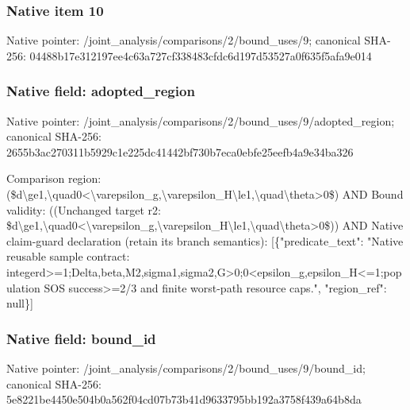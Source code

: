 \documentclass[10pt,a4paper]{article}
\begin{document}
\subsubsection{Native item 10}
Native pointer: /joint\_\allowbreak{}analysis/comparisons/2/bound\_\allowbreak{}uses/9; canonical SHA-256: 04488b17e312197ee4c63a727cf338483cfdc6d197d53527a0f635f5afa9e014

\subsubsection{Native field: adopted\_\allowbreak{}region}
Native pointer: /joint\_\allowbreak{}analysis/comparisons/2/bound\_\allowbreak{}uses/9/adopted\_\allowbreak{}region; canonical SHA-256: 2655b3ac270311b5929c1e225dc41442bf730b7eca0ebfe25eefb4a9e34ba326

\begingroup\raggedright\sloppy Comparison region:\allowbreak{} (\$d\textbackslash{}ge1,\allowbreak{}\textbackslash{}quad0<\textbackslash{}varepsilon\_\allowbreak{}g,\allowbreak{}\textbackslash{}varepsilon\_\allowbreak{}H\textbackslash{}le1,\allowbreak{}\textbackslash{}quad\textbackslash{}theta>0\$) AND Bound validity:\allowbreak{} ((Unchanged target r2:\allowbreak{} \$d\textbackslash{}ge1,\allowbreak{}\textbackslash{}quad0<\textbackslash{}varepsilon\_\allowbreak{}g,\allowbreak{}\textbackslash{}varepsilon\_\allowbreak{}H\textbackslash{}le1,\allowbreak{}\textbackslash{}quad\textbackslash{}theta>0\$)) AND Native claim-guard declaration (retain its branch semantics):\allowbreak{} [\{"predicate\_\allowbreak{}text":\allowbreak{} "Native reusable sample contract:\allowbreak{} integerd>=\allowbreak{}1;\allowbreak{}Delta,\allowbreak{}beta,\allowbreak{}M2,\allowbreak{}sigma1,\allowbreak{}sigma2,\allowbreak{}G>0;\allowbreak{}0<epsilon\_\allowbreak{}g,\allowbreak{}epsilon\_\allowbreak{}H<=\allowbreak{}1;\allowbreak{}population SOS success>=\allowbreak{}2/\allowbreak{}3 and finite worst-path resource caps.",\allowbreak{} "region\_\allowbreak{}ref":\allowbreak{} null\}]\par\endgroup

\subsubsection{Native field: bound\_\allowbreak{}id}
Native pointer: /joint\_\allowbreak{}analysis/comparisons/2/bound\_\allowbreak{}uses/9/bound\_\allowbreak{}id; canonical SHA-256: 5e8221be4450e504b0a562f04cd07b73b41d9633795bb192a3758f439a64b8da
\end{document}
